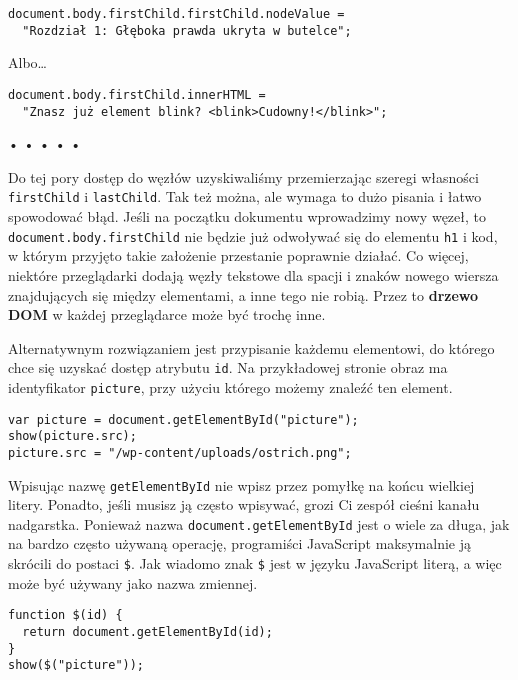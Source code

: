   
\begin{verbatim} 
document.body.firstChild.firstChild.nodeValue =
  "Rozdział 1: Głęboka prawda ukryta w butelce";
\end{verbatim}
  
Albo…

  
\begin{verbatim} 
document.body.firstChild.innerHTML =
  "Znasz już element blink? <blink>Cudowny!</blink>";
\end{verbatim}


\begin{center}
• • • • •
\end{center}

  
Do tej pory dostęp do węzłów uzyskiwaliśmy przemierzając szeregi własności \texttt{firstChild} i \texttt{lastChild}. Tak też można, ale wymaga to dużo pisania i łatwo spowodować błąd. Jeśli na początku dokumentu wprowadzimy nowy węzeł, to \texttt{document.body.firstChild} nie będzie już odwoływać się do elementu \texttt{h1} i kod, w którym przyjęto takie założenie przestanie poprawnie działać. Co więcej, niektóre przeglądarki dodają węzły tekstowe dla spacji i znaków nowego wiersza znajdujących się między elementami, a inne tego nie robią. Przez to \textbf{drzewo DOM} w każdej przeglądarce może być trochę inne.

  
Alternatywnym rozwiązaniem jest przypisanie każdemu elementowi, do którego chce się uzyskać dostęp atrybutu \texttt{id}. Na przykładowej stronie obraz ma identyfikator \texttt{picture}, przy użyciu którego możemy znaleźć ten element.

  
\begin{verbatim} 
var picture = document.getElementById("picture");
show(picture.src);
picture.src = "/wp-content/uploads/ostrich.png";
\end{verbatim}
  
Wpisując nazwę \texttt{getElementById} nie wpisz przez pomyłkę na końcu wielkiej litery. Ponadto, jeśli musisz ją często wpisywać, grozi Ci zespół cieśni kanału nadgarstka. Ponieważ nazwa \texttt{document.getElementById} jest o wiele za długa, jak na bardzo często używaną operację, programiści JavaScript maksymalnie ją skrócili do postaci \texttt{\$}\index{\$}. Jak wiadomo znak \texttt{\$} jest w języku JavaScript literą, a więc może być używany jako nazwa zmiennej.

  
\begin{verbatim} 
function $(id) {
  return document.getElementById(id);
}
show($("picture"));
\end{verbatim}
  
